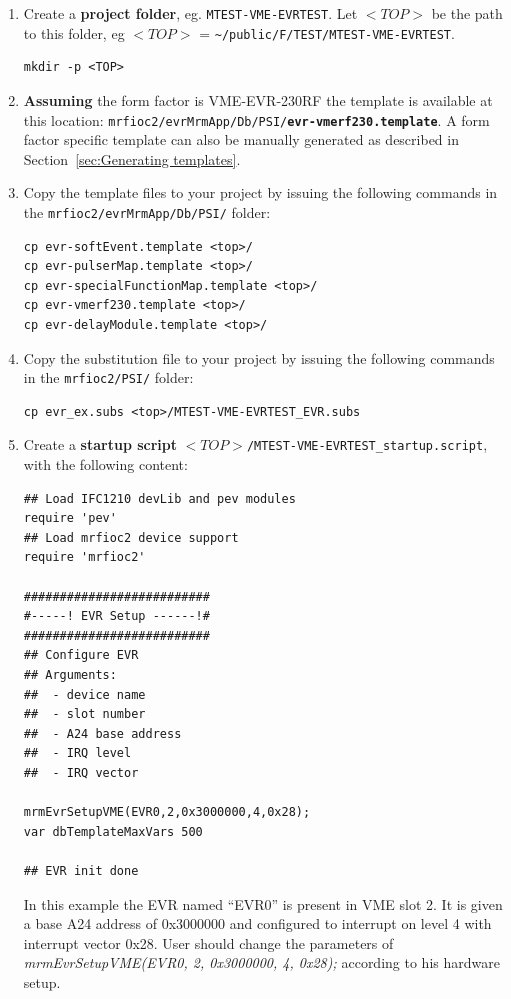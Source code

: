 \documentclass[12pt,a4paper]{article}
\begin{document}
\begin{enumerate}
\item
  Create a \textbf{project folder}, eg. \texttt{MTEST-VME-EVRTEST}. Let $ <TOP> $ be the path to this folder, eg $ <TOP> $ = \texttt{\textasciitilde/public/F/TEST/MTEST-VME-EVRTEST}.
\begin{verbatim}
mkdir -p <TOP>
\end{verbatim}
  
\item
  \textbf{Assuming} the form factor is VME-EVR-230RF the template is available at this location: \texttt{mrfioc2/evrMrmApp/Db/PSI/\textbf{evr-vmerf230.template}}. A form factor specific template can also be manually generated as described in Section~\ref{sec:Generating templates}.  

\item
  Copy the template files to your project by issuing the following commands in the \texttt{mrfioc2/evrMrmApp/Db/PSI/} folder:
\begin{verbatim}
cp evr-softEvent.template <top>/
cp evr-pulserMap.template <top>/
cp evr-specialFunctionMap.template <top>/
cp evr-vmerf230.template <top>/
cp evr-delayModule.template <top>/
\end{verbatim}

\item 
  Copy the substitution file to your project by issuing the following commands in the \texttt{mrfioc2/PSI/} folder:
\begin{verbatim}
cp evr_ex.subs <top>/MTEST-VME-EVRTEST_EVR.subs
\end{verbatim}

\item
  Create a \textbf{startup script}
  \texttt{$<TOP>$/MTEST-VME-EVRTEST\_startup.script}, with the following content:

\begin{verbatim}
## Load IFC1210 devLib and pev modules
require 'pev'
## Load mrfioc2 device support
require 'mrfioc2'

##########################
#-----! EVR Setup ------!#
##########################
## Configure EVR
## Arguments:
##  - device name
##  - slot number
##  - A24 base address
##  - IRQ level
##  - IRQ vector

mrmEvrSetupVME(EVR0,2,0x3000000,4,0x28);
var dbTemplateMaxVars 500

## EVR init done
\end{verbatim}

  In this example the EVR named ``EVR0'' is present in VME slot 2. It is
  given a base A24 address of 0x3000000 and configured to interrupt on
  level 4 with interrupt vector 0x28. User should change the parameters of \emph{mrmEvrSetupVME(EVR0, 2, 0x3000000, 4, 0x28);} according to his hardware setup.
  

\end{enumerate}
\end{document}

